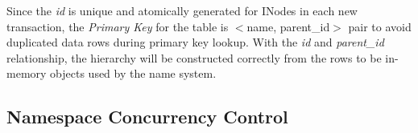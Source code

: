 \noindent Since the \textit{id} is unique and atomically generated for INodes in each new transaction, the \textit{Primary Key} for the table is $<$name, parent\_id$>$ pair to avoid duplicated data rows during primary key lookup. With the \textit{id} and \textit{parent\_id} relationship, the hierarchy will be constructed correctly from the rows to be in-memory objects used by the name system.

\subsection{Namespace Concurrency Control}